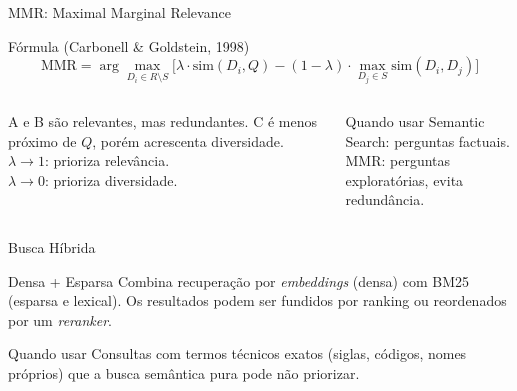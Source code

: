 \documentclass[aspectratio=169]{beamer}
\begin{document}
\begin{frame}[shrink=5]{MMR: Maximal Marginal Relevance}
    \begin{block}{Fórmula (Carbonell \& Goldstein, 1998)}
        \footnotesize
        \[
          \text{MMR} = \arg\max_{D_i \in R \setminus S} \Big[ \lambda \cdot \text{sim}(D_i, Q) - (1-\lambda) \cdot \max_{D_j \in S} \text{sim}(D_i, D_j) \Big]
        \]
    \end{block}
    \begin{columns}
        \centering
        \footnotesize A e B são relevantes, mas redundantes. C é menos próximo de $Q$, porém acrescenta diversidade.\\[4pt]
        $\lambda \to 1$: prioriza relevância.\\
        $\lambda \to 0$: prioriza diversidade.
        \pause
        \begin{alertblock}{Quando usar}
            \footnotesize Semantic Search: perguntas factuais.\\
            MMR: perguntas exploratórias, evita redundância.
        \end{alertblock}
    \end{columns}
\end{frame}

\begin{frame}{Busca Híbrida}
    \begin{block}{Densa + Esparsa}
        \footnotesize Combina recuperação por \textit{embeddings} (densa) com BM25 (esparsa e lexical). Os resultados podem ser fundidos por ranking ou reordenados por um \textit{reranker}.
    \end{block}
    \pause
    \begin{alertblock}{Quando usar}
        \footnotesize Consultas com termos técnicos exatos (siglas, códigos, nomes próprios) que a busca semântica pura pode não priorizar.
    \end{alertblock}
\end{frame}
\end{document}
